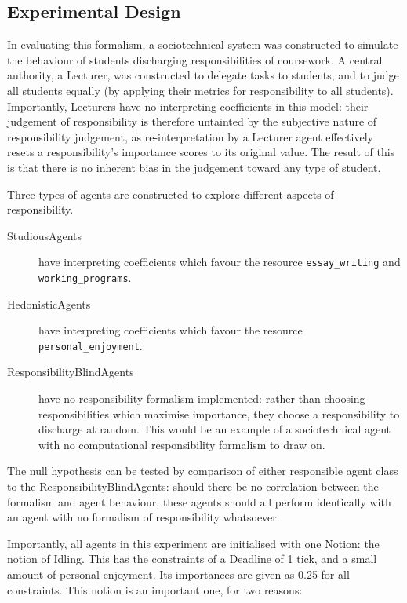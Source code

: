 \subsection{Experimental Design}
In evaluating this formalism, a sociotechnical system was constructed to simulate the behaviour of students discharging responsibilities of coursework. A central authority, a Lecturer, was constructed to delegate tasks to students, and to judge all students equally (by applying their metrics for responsibility to all students). Importantly, Lecturers have no interpreting coefficients in this model: their judgement of responsibility is therefore untainted by the subjective nature of responsibility judgement, as re-interpretation by a Lecturer agent effectively resets a responsibility's importance scores to its original value. The result of this is that there is no inherent bias in the judgement toward any type of student.\par

Three types of agents are constructed to explore different aspects of responsibility. 

\begin{description}
    \item [StudiousAgents ] have interpreting coefficients which favour the resource \texttt{essay\_writing} and \texttt{working\_programs}.
    \item [HedonisticAgents ] have interpreting coefficients which favour the resource \texttt{personal\_enjoyment}.
    \item [ResponsibilityBlindAgents ] have no responsibility formalism implemented: rather than choosing responsibilities which maximise importance, they choose a responsibility to discharge at random. This would be an example of a sociotechnical agent with no computational responsibility formalism to draw on.
\end{description}

The null hypothesis can be tested by comparison of either responsible agent class to the ResponsibilityBlindAgents: should there be no correlation between the formalism and agent behaviour, these agents should all perform identically with an agent with no formalism of responsibility whatsoever.\par

Importantly, all agents in this experiment are initialised with one Notion: the notion of Idling. This has the constraints of a Deadline of 1 tick, and a small amount of personal enjoyment. Its importances are given as 0.25 for all constraints. This notion is an important one, for two reasons:

